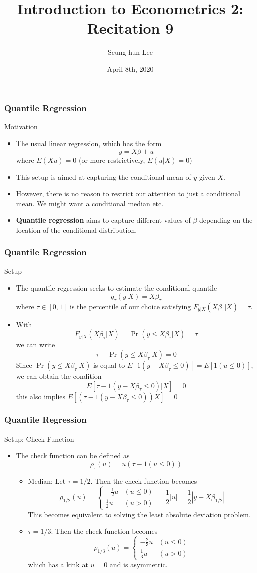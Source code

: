 \documentclass{beamer}
\title[Econometrics 2]{Introduction to Econometrics 2: Recitation 9} %
\author{Seung-hun Lee}
\institute{Columbia University}
\date{April 8th, 2020}
\begin{document}
\begin{frame}
\titlepage
\end{frame}


\begin{frame}
\frametitle{Quantile Regression}
Motivation
\begin{itemize}
\item The usual linear regression, which has the form
\[
y= X\beta+u
\]
where $E(Xu)=0$ (or more restrictively, $E(u|X)=0$)
\item This setup is aimed at capturing the conditional mean of $y$ given $X$. 
\item However, there is no reason to restrict our attention to just a conditional mean. We might want a conditional median etc.
\item  \textbf{Quantile regression} aims to capture different values of $\beta$ depending on the location of the conditional distribution.
\end{itemize}
\end{frame}

\begin{frame}
\frametitle{Quantile Regression}
Setup
\begin{itemize}
\item The quantile regression seeks to estimate the conditional quantile
\[
q_\tau(y | X)=X\beta_\tau
\]
where $\tau\in[0,1]$ is the percentile of our choice satisfying $F_{y|X}(X\beta_\tau|X)=\tau$.
\item With
\[
F_{y|X}(X\beta_\tau|X)=\Pr(y\leq X\beta_\tau|X)=\tau
\]
we can write 
\[
\tau-\Pr(y\leq X\beta_\tau|X)=0
\]
Since $\Pr(y\leq X\beta_\tau|X)$ is equal to $E[1(y- X\beta_\tau\leq 0)]=E[1(u\leq0)]$, we can obtain the condition
\[
E[\tau-1(y- X\beta_\tau\leq 0)|X]=0
\]
this also implies $E[(\tau-1(y- X\beta_\tau\leq 0))X]=0$
\end{itemize}
\end{frame}

\begin{frame}
\frametitle{Quantile Regression}
Setup: Check Function
\begin{itemize}
\item The check function can be defined as
\[
\rho_\tau(u)=u(\tau-1(u\leq0))
\]
\begin{itemize}
\item Median: Let $\tau=1/2$. Then the check function becomes
\[
\rho_{1/2}(u)=\begin{cases}-\frac{1}{2}u & (u\leq 0) \\ \frac{1}{2}u & (u>0) \end{cases} = \frac{1}{2}|u|=\frac{1}{2}|y-X\beta_{1/2}|
\]
This becomes equivalent to solving the least absolute deviation problem.
\item $\tau=1/3$: Then the check function becomes
\[
\rho_{1/3}(u)=\begin{cases}-\frac{2}{3}u & (u\leq 0) \\ \frac{1}{3}u & (u>0) \end{cases}
\]
which has a kink at $u=0$ and is asymmetric.
\end{itemize}
\end{itemize}
\end{frame}
\end{document}
